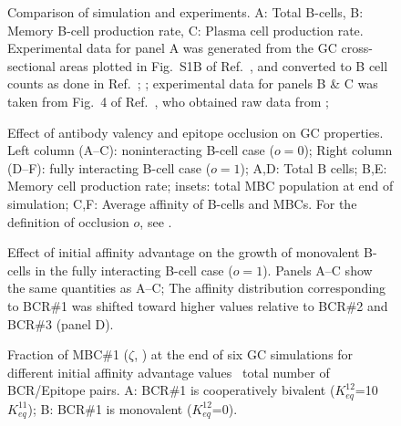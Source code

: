 \begin{figure}[hb]
\centering
{}
\caption{Comparison of simulation and experiments.
A: Total B-cells, B: Memory B-cell production rate, C: Plasma cell
production rate. Experimental data for panel A was generated from the GC
cross-sectional areas plotted in Fig.~S1B of Ref.~, and converted to B cell counts
as done in Ref.~; 
; experimental data for panels B \& C was taken from Fig.~4 of Ref.~, who
obtained raw data from \citet{weisel16}; 
}
\end{figure}
%
\begin{figure}[hb]
\centering
{}
\caption{Effect of antibody valency and epitope occlusion on GC properties.
Left column (A--C): noninteracting B-cell case ($o=0$);
Right column (D--F): fully interacting B-cell case ($o=1$);
A,D: Total B cells;
B,E: Memory cell production rate; insets: total MBC population at end of simulation;
C,F: Average affinity of B-cells and MBCs.  For the definition of occlusion $o$, see .
}
\end{figure}
%
\begin{figure}[hb]
\centering
{}
\caption{Effect of initial affinity advantage on the growth of monovalent B-cells in the fully interacting B-cell case ($o=1$).
Panels A--C show the same quantities as A--C;
The affinity distribution corresponding to BCR\#1 was shifted toward higher values relative to BCR\#2 and BCR\#3
(panel D).
}
\end{figure}
%
\begin{figure}[hb]
\centering
\hide{
\texttt{[image: test5ki-d3x-occl-k12=10agc1=1.eps]}
\texttt{[image: test5ki-d3x-occl-k12=0agc1=1.eps]}
}
\caption{Fraction of MBC\#1 ($\zeta$, ) at the end of six GC simulations for different initial affinity advantage values
 \vs~total number of BCR/Epitope pairs.
A: BCR\#1 is cooperatively bivalent ($K^{12}_{eq}$=10$K^{11}_{eq}$);
B: BCR\#1 is monovalent ($K^{12}_{eq}$=0).
}
\end{figure}
